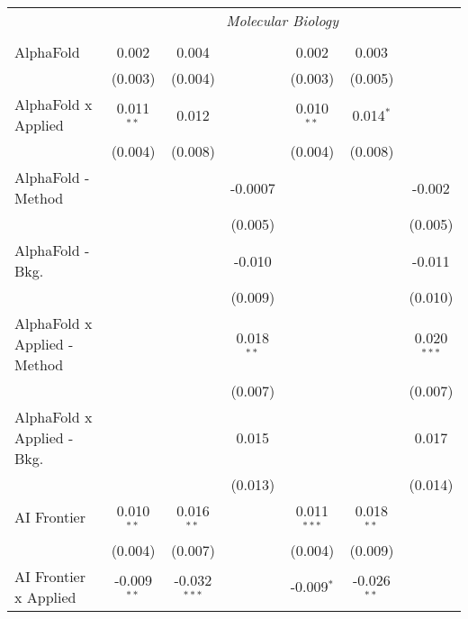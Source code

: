 \begin{tabular}{lcccccc}
 & \multicolumn{6}{c}{\textit{Molecular Biology}} \\ \\
   AlphaFold                      & 0.002         & 0.004          &                & 0.002         & 0.003         &   \\   
                                  & (0.003)       & (0.004)        &                & (0.003)       & (0.005)       &   \\   
   AlphaFold x Applied            & 0.011$^{**}$  & 0.012          &                & 0.010$^{**}$  & 0.014$^{*}$   &   \\   
                                  & (0.004)       & (0.008)        &                & (0.004)       & (0.008)       &   \\   
   AlphaFold - Method             &               &                & -0.0007        &               &               & -0.002\\   
                                  &               &                & (0.005)        &               &               & (0.005)\\   
   AlphaFold - Bkg.               &               &                & -0.010         &               &               & -0.011\\   
                                  &               &                & (0.009)        &               &               & (0.010)\\   
   AlphaFold x Applied - Method   &               &                & 0.018$^{**}$   &               &               & 0.020$^{***}$\\   
                                  &               &                & (0.007)        &               &               & (0.007)\\   
   AlphaFold x Applied - Bkg.     &               &                & 0.015          &               &               & 0.017\\   
                                  &               &                & (0.013)        &               &               & (0.014)\\   
   AI Frontier                    & 0.010$^{**}$  & 0.016$^{**}$   &                & 0.011$^{***}$ & 0.018$^{**}$  &   \\   
                                  & (0.004)       & (0.007)        &                & (0.004)       & (0.009)       &   \\   
   AI Frontier x Applied          & -0.009$^{**}$ & -0.032$^{***}$ &                & -0.009$^{*}$  & -0.026$^{**}$ &   \\   

\end{tabular}
